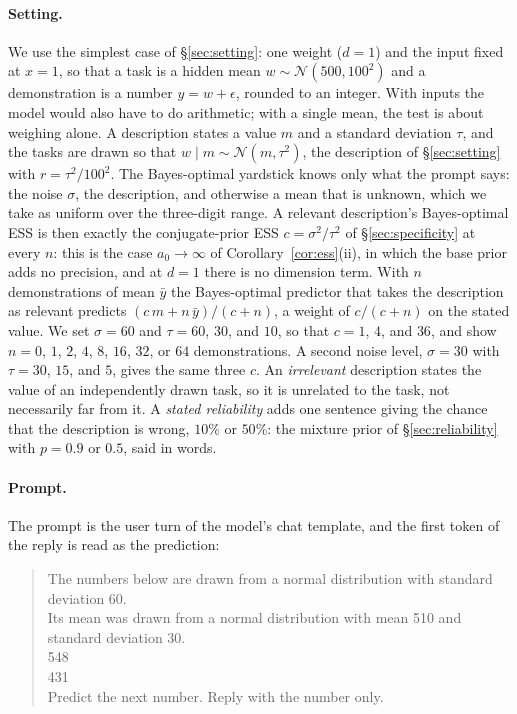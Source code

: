 \documentclass{article}
\begin{document}
\paragraph{Setting.} We use the simplest case of \S\ref{sec:setting}: one weight ($d = 1$) and the input fixed at $x = 1$, so that a task is a hidden mean $w \sim \mathcal{N}(500, 100^2)$ and a demonstration is a number $y = w + \epsilon$, rounded to an integer. With inputs the model would also have to do arithmetic; with a single mean, the test is about weighing alone. A description states a value $m$ and a standard deviation $\tau$, and the tasks are drawn so that $w \mid m \sim \mathcal{N}(m, \tau^2)$, the description of \S\ref{sec:setting} with $r = \tau^2 / 100^2$. The Bayes-optimal yardstick knows only what the prompt says: the noise $\sigma$, the description, and otherwise a mean that is unknown, which we take as uniform over the three-digit range. A relevant description's Bayes-optimal ESS is then exactly the conjugate-prior ESS $c = \sigma^2 / \tau^2$ of \S\ref{sec:specificity} at every $n$: this is the case $a_0 \to \infty$ of Corollary~\ref{cor:ess}(ii), in which the base prior adds no precision, and at $d = 1$ there is no dimension term. With $n$ demonstrations of mean $\bar y$ the Bayes-optimal predictor that takes the description as relevant predicts $(c\,m + n\,\bar y)/(c + n)$, a weight of $c/(c+n)$ on the stated value. We set $\sigma = 60$ and $\tau = 60$, $30$, and $10$, so that $c = 1$, $4$, and $36$, and show $n = 0$, $1$, $2$, $4$, $8$, $16$, $32$, or $64$ demonstrations. A second noise level, $\sigma = 30$ with $\tau = 30$, $15$, and $5$, gives the same three $c$. An \emph{irrelevant} description states the value of an independently drawn task, so it is unrelated to the task, not necessarily far from it. A \emph{stated reliability} adds one sentence giving the chance that the description is wrong, $10\%$ or $50\%$: the mixture prior of \S\ref{sec:reliability} with $p = 0.9$ or $0.5$, said in words.

\paragraph{Prompt.} The prompt is the user turn of the model's chat template, and the first token of the reply is read as the prediction:

\begin{quote}\small\ttfamily
The numbers below are drawn from a normal distribution with standard deviation 60.\\
Its mean was drawn from a normal distribution with mean 510 and standard deviation 30.\\[3pt]
548\\
431\\[3pt]
Predict the next number. Reply with the number only.
\end{quote}
\end{document}
